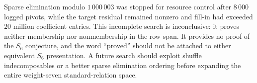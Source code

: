 Sparse elimination modulo $1\,000\,003$ was stopped for resource control
after $8\,000$ logged pivots, while the target residual remained
nonzero and fill-in had exceeded $20$ million coefficient entries.
This incomplete search is inconclusive: it proves neither membership
nor nonmembership in the row span. It provides no proof of the $S_6$
conjecture, and the word ``proved'' should not be attached to either
equivalent $S_6$ presentation. A future search should exploit shuffle
indecomposables or a better sparse elimination ordering before expanding
the entire weight-seven standard-relation space.
